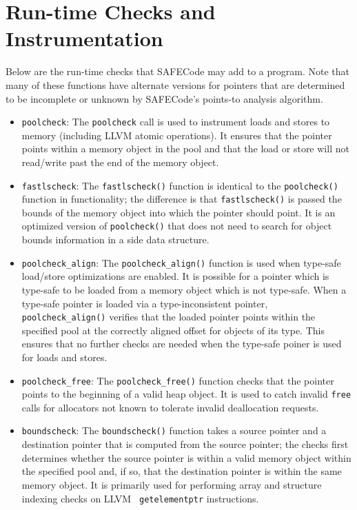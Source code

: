 \section{Run-time Checks and Instrumentation}
\label{section:checks}

Below are the run-time checks that SAFECode may add to a program.
Note that many of these functions have alternate versions for pointers
that are determined to be incomplete or unknown by SAFECode's
points-to analysis algorithm.

\begin{itemize}
\item{\tt poolcheck}:
The {\tt poolcheck} call is used to instrument loads and stores to
memory (including LLVM atomic operations).  It ensures that the
pointer points within a memory object in the pool and that the load or
store will not read/write past the end of the memory object.

\item{\tt fastlscheck}:
The {\tt fastlscheck()} function is identical to the {\tt poolcheck()}
function in functionality; the difference is that {\tt fastlscheck()}
is passed the bounds of the memory object into which the pointer
should point.  It is an optimized version of {\tt poolcheck()} that
does not need to search for object bounds information in a side data
structure.

\item{\tt poolcheck\_align}:
The {\tt poolcheck\_align()} function is used when type-safe
load/store optimizations are enabled.  It is possible for a pointer which
is type-safe to be loaded from a memory object which is not type-safe.
When a type-safe pointer is loaded via a type-inconsistent pointer,
{\tt poolcheck\_align()} verifies that the loaded pointer points
within the specified pool at the correctly aligned offset for objects
of its type.  This ensures that no further checks are needed when the
type-safe poiner is used for loads and stores.

\item{\tt poolcheck\_free}:
The {\tt poolcheck\_free()} function checks that the pointer points to
the beginning of a valid heap object.  It is used to catch invalid
{\tt free} calls for allocators not known to tolerate invalid
deallocation requests.

\item{\tt boundscheck}:
The {\tt boundscheck()} function takes a source pointer and a
destination pointer that is computed from the source pointer; the
checks first determines whether the source pointer is within a valid
memory object within the specified pool and, if so, that the
destination pointer is within the same memory object.  It is primarily
used for performing array and structure indexing checks on LLVM {\tt
getelementptr} instructions.


\end{itemize}
